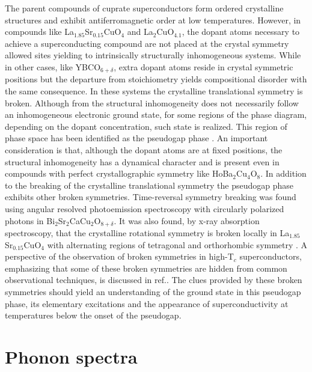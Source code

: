 The parent compounds of cuprate superconductors form ordered crystalline structures and exhibit antiferromagnetic order at low temperatures. 
However,  in compounds like La$_{1.85}$Sr$_{0.15}$CuO$_{4}$ and La$_{2}$CuO$_{4.1}$, the dopant atoms necessary to achieve a superconducting compound are not placed at the crystal symmetry allowed sites yielding to intrinsically structurally inhomogeneous systems\cite{Poccia2011}. 
While in other cases, like YBCO$_{6+\delta}$, extra dopant atoms reside in crystal symmetric positions but the departure from stoichiometry yields compositional disorder\cite{Chen1988} \cite{Andersen1990} with the same consequence. 
In these systems the crystalline translational symmetry is broken. 
Although from the structural inhomogeneity does not necessarily follow an inhomogeneous electronic ground state, for some regions of the phase diagram, depending on the dopant concentration, such state is realized. 
This region of phase space has been identified as the pseudogap phase\cite{Kresin2009} \cite{Muller2007} \cite{Timusk1999}. 
An important consideration is that, although the dopant atoms are at fixed positions, the structural inhomogeneity has a dynamical character\cite{Mihailovic2005} \cite{Bianconi1996} and is present even in compounds with perfect crystallographic symmetry like HoBa$_{2}$Cu$_{4}$O$_{8}$\cite{RubioTemprano2000}. 
In addition to the breaking of the crystalline translational symmetry the pseudogap phase exhibits other broken symmetries. 
Time-reversal symmetry breaking was found using angular resolved photoemission spectroscopy with circularly polarized photons in Bi$_{2}$Sr$_{2}$CaCu$_{2}$O$_{8+\delta}$\cite{Kaminski2002}. 
It was also found, by x-ray absorption spectroscopy, that the crystalline rotational symmetry is broken locally in La$_{1.85}$Sr$_{0.15}$CuO$_{4}$ with alternating regions of tetragonal and orthorhombic symmetry \cite{Bianconi1996}. 
A perspective of the observation of broken symmetries in high-T$_{c}$ superconductors, emphasizing that some of these broken symmetries are hidden from common observational techniques, is discussed in ref.\cite{Chakravarty2011}. The clues provided by these broken symmetries should yield an understanding of the ground state in this pseudogap phase, its elementary excitations and the appearance of superconductivity at temperatures below the onset of the pseudogap. 


\section{Phonon spectra}
